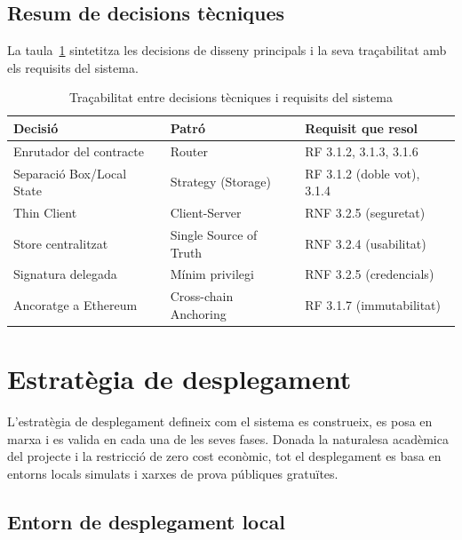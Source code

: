 \subsection{Resum de decisions tècniques}
 
La taula~\ref{tab:decisions} sintetitza les decisions de disseny principals i la seva traçabilitat amb els requisits del sistema.
 
\begin{table}[H]
\centering
\small
\begin{tabularx}{\textwidth}{l l X}
\toprule
\textbf{Decisió} & \textbf{Patró} & \textbf{Requisit que resol} \\
\midrule
Enrutador del contracte & Router & RF 3.1.2, 3.1.3, 3.1.6 \\
Separació Box/Local State & Strategy (Storage) & RF 3.1.2 (doble vot), 3.1.4 \\
Thin Client & Client-Server & RNF 3.2.5 (seguretat) \\
Store centralitzat & Single Source of Truth & RNF 3.2.4 (usabilitat) \\
Signatura delegada & Mínim privilegi & RNF 3.2.5 (credencials) \\
Ancoratge a Ethereum & Cross-chain Anchoring & RF 3.1.7 (immutabilitat) \\
\bottomrule
\end{tabularx}
\caption{Traçabilitat entre decisions tècniques i requisits del sistema}
\label{tab:decisions}
\end{table}
 
 
\section{Estratègia de desplegament}
 
L'estratègia de desplegament defineix com el sistema es construeix, es posa en marxa i es valida en cada una de les seves fases. Donada la naturalesa acadèmica del projecte i la restricció de zero cost econòmic, tot el desplegament es basa en entorns locals simulats i xarxes de prova públiques gratuïtes.
 
\subsection{Entorn de desplegament local}
 
